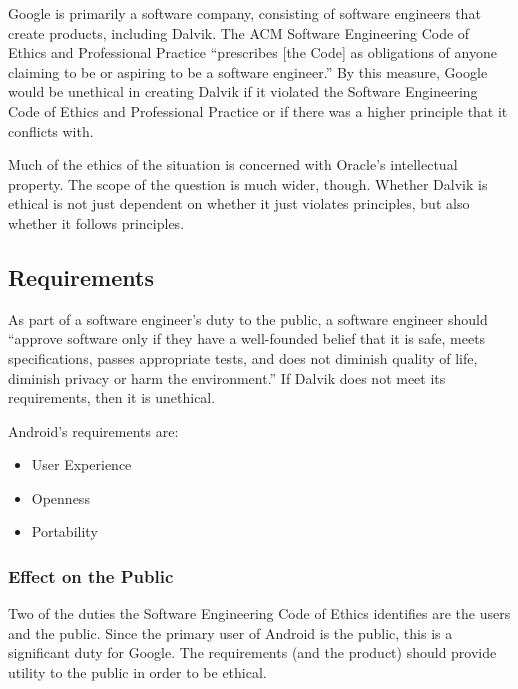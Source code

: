 \documentclass[11pt]{article}
\begin{document}
\begin{multicols}{2}
Google is primarily a software company, consisting of software engineers that
create products, including Dalvik.  The ACM Software Engineering Code of Ethics
and Professional Practice ``prescribes [the Code] as obligations of anyone
claiming to be or aspiring to be a software engineer.'' \cite{secode} By this
measure, Google would be unethical in creating Dalvik if it violated the
Software Engineering Code of Ethics and Professional Practice \cite{secode} or
if there was a higher principle that it conflicts with.

Much of the ethics of the situation is concerned with Oracle's intellectual
property.  The scope of the question is much wider, though.  Whether Dalvik is
ethical is not just dependent on whether it just violates principles, but also
whether it follows principles.


\subsection{Requirements} %
\label{sub:requirements}

As part of a software engineer's duty to the public, a software engineer should
``approve software only if they have a well-founded belief that it is safe,
meets specifications, passes appropriate tests, and does not diminish quality of
life, diminish privacy or harm the environment.'' \cite[\S~1.03]{secode} If
Dalvik does not meet its requirements, then it is unethical.

Android's requirements are: \cite{open-handset-alliance-ann}

\begin{itemize}
    \item User Experience
    \item Openness
    \item Portability
\end{itemize}

\subsubsection{Effect on the Public} %
\label{ssub:public-effect}

Two of the duties the Software Engineering Code of Ethics identifies are the
users and the public.  Since the primary user of Android is the public, this is
a significant duty for Google.  The requirements (and the product) should
provide utility to the public in order to be ethical.


\end{multicols}
\end{document}
